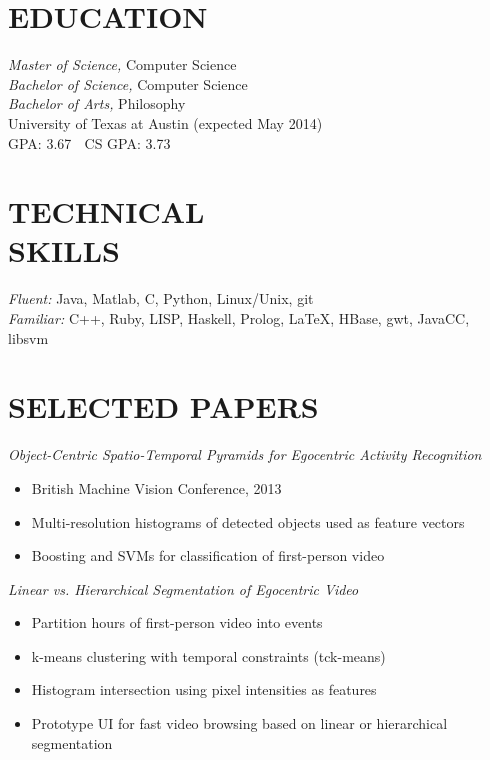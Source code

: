 \documentclass[line,margin]{res}
\begin{document}
\address{\textbf{email:} tomas.mccandless@gmail.com, \textbf{phone:} (210) 232-1477} 
\address{\textbf{web:} tomasmccandless.com}

 
\begin{resume}
 
 
\section{EDUCATION} {\sl Master of Science,} Computer Science \\
                    {\sl Bachelor of Science,} Computer Science \\
										{\sl Bachelor of Arts,} Philosophy \\
                University of Texas at Austin 
                (expected May 2014) \\
								GPA: 3.67  $\;$ CS GPA: 3.73 
 
\section{TECHNICAL \\ SKILLS} {\sl Fluent:} Java, Matlab, C, Python, Linux/Unix, git \\
                {\sl Familiar:} C++, Ruby, LISP, Haskell, Prolog, \LaTeX, HBase, gwt, JavaCC, libsvm \\


                              \section{SELECTED PAPERS} {\sl Object-Centric Spatio-Temporal Pyramids for Egocentric Activity Recognition}
	\begin{itemize} \itemsep -2pt
  \item British Machine Vision Conference, 2013
	\item Multi-resolution histograms of detected objects used as feature vectors
	\item Boosting and SVMs for classification of first-person video
	\end{itemize}


 {\sl Linear vs. Hierarchical Segmentation of Egocentric Video} 
	\begin{itemize} \itemsep -2pt
	\item Partition hours of first-person video into events 
	\item k-means clustering with temporal constraints (tck-means)
	\item Histogram intersection using pixel intensities as features
	\item Prototype UI for fast video browsing based on linear or hierarchical segmentation
	\end{itemize}


\end{resume}
\end{document}

